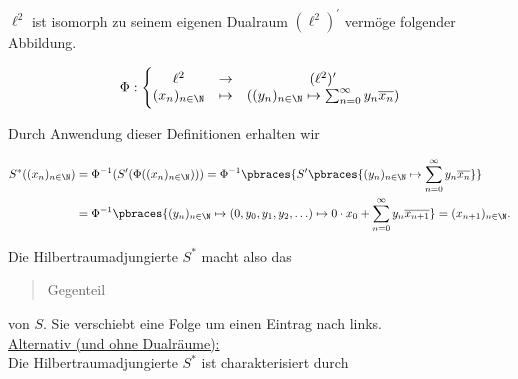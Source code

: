 \begin{solution}
\begin{itemize}
  \begin{center}
   \\
  \end{center}

  $\ell^2$ ist isomorph zu seinem eigenen Dualraum $(\ell^2)^\prime$ vermöge folgender Abbildung.

  \begin{align*}
    \Phi: \Bigg \{
    \begin{matrix}
      \ell^2             &
      \rightarrow        &
      (\ell^2)^\prime \\
      (x_n)_{n \in \N}   &
      \mapsto            &
      ((y_n)_{n \in \N} \mapsto \sum_{n=0}^\infty y_n \overline{x_n})
    \end{matrix}
  \end{align*}

  Durch Anwendung dieser Definitionen erhalten wir

  \begin{align*}
    S^\ast((x_n)_{n \in \N})
    & =
    \Phi^{-1}(S^\prime(\Phi((x_n)_{n \in \N})))
    =
    \Phi^{-1} \pbraces
    {
      S^\prime \pbraces
      {
        (y_n)_{n \in \N}
        \mapsto
        \sum_{n=0}^\infty
        y_n \overline{x_n}
      }
    } \\
    & =
    \Phi^{-1} \pbraces
    {
      (y_n)_{n \in \N}
      \mapsto
      (0, y_0, y_1, y_2, \ldots)
      \mapsto
      0 \cdot x_0 +
      \sum_{n=0}^\infty
      y_n \overline{x_{n+1}}
    }
    =
    (x_{n+1})_{n \in \N}.
  \end{align*}

  Die Hilbertraumadjungierte $S^\ast$ macht also das \blockquote{Gegenteil} von $S$.
  Sie verschiebt eine Folge um einen Eintrag nach links. \\

  \underline{Alternativ (und ohne Dualräume):} \\

  Die Hilbertraumadjungierte $S^\ast$ ist charakterisiert durch


\end{itemize}
\end{solution}
